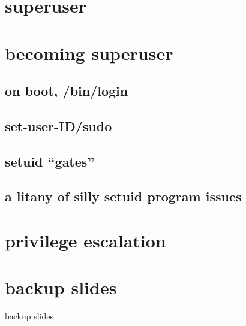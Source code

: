 %

\section{superuser}


\section{becoming superuser}

\subsection{on boot, /bin/login}


\subsection{set-user-ID/sudo}




\subsection{setuid ``gates''}


\subsection{a litany of silly setuid program issues}


\section{privilege escalation}




\section{backup slides}
\begin{frame}{backup slides}
\end{frame}



